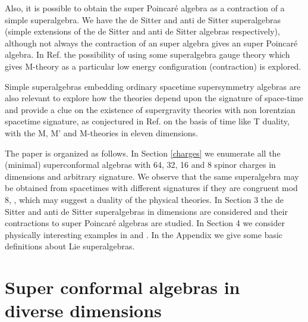 \documentclass[a4paper,12pt]{article}
\begin{document}
 Also, it is possible to obtain the super Poincar\'e
algebra as a contraction of a simple superalgebra. We have   the
de Sitter and anti de Sitter superalgebras (simple extensions of
the de Sitter and anti de Sitter algebras respectively), although
not always the contraction of an \coordHE{} super algebra gives an
\coordHE{} super Poincar\'e algebra. In Ref.\cite{ho} the possibility
of using some superalgebra gauge theory which gives M-theory  as a
particular low energy configuration (contraction) is explored.

Simple superalgebras embedding ordinary spacetime supersymmetry
algebras are also relevant to explore how the theories depend upon
the signature of space-time and provide a clue on the existence of
supergravity theories with non lorentzian spacetime signature, as
conjectured in Ref.\cite{hu} on the basis of time like T duality,
with the M, M' and  M\myHighlight{$^*$}\coordHE{}-theories in eleven dimensions.

\smallskip

The paper is organized as follows. In Section \ref{charges} we
enumerate all the (minimal) superconformal algebras with 64, 32,
16 and 8 spinor charges in dimensions \coordHE{} and arbitrary
signature. We observe that the same superalgebra may be obtained
from spacetimes with different signatures \coordHE{} if they
are congruent mod 8, \coordHE{}, which may suggest a
duality of the physical theories. In Section 3 the de Sitter and
anti de Sitter superalgebras in dimensions \coordHE{} are
considered and their contractions to super Poincar\'e algebras are
studied. In Section 4 we consider physically interesting examples
in \coordHE{} and \coordHE{}. In the Appendix we give some basic
definitions about Lie superalgebras.





\section{Super conformal algebras in diverse dimensions\label{charges}}
\end{document}
